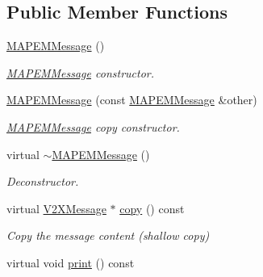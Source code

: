 \subsection*{Public Member Functions}
\begin{DoxyCompactItemize}
\item 
\hyperlink{classMAPEMMessage_af1b0b1d79d1a94869da2709cb2e33f86}{M\+A\+P\+E\+M\+Message} ()\hypertarget{classMAPEMMessage_af1b0b1d79d1a94869da2709cb2e33f86}{}\label{classMAPEMMessage_af1b0b1d79d1a94869da2709cb2e33f86}

\begin{DoxyCompactList}\small\item\em \hyperlink{classMAPEMMessage}{M\+A\+P\+E\+M\+Message} constructor. \end{DoxyCompactList}\item 
\hyperlink{classMAPEMMessage_a618033769eb41ed96b2942103efc0e42}{M\+A\+P\+E\+M\+Message} (const \hyperlink{classMAPEMMessage}{M\+A\+P\+E\+M\+Message} \&other)
\begin{DoxyCompactList}\small\item\em \hyperlink{classMAPEMMessage}{M\+A\+P\+E\+M\+Message} copy constructor. \end{DoxyCompactList}\item 
virtual \hyperlink{classMAPEMMessage_ab51ba0e9274fd8509c503801ee018d84}{$\sim$\+M\+A\+P\+E\+M\+Message} ()\hypertarget{classMAPEMMessage_ab51ba0e9274fd8509c503801ee018d84}{}\label{classMAPEMMessage_ab51ba0e9274fd8509c503801ee018d84}

\begin{DoxyCompactList}\small\item\em Deconstructor. \end{DoxyCompactList}\item 
virtual \hyperlink{classV2XMessage}{V2\+X\+Message} $\ast$ \hyperlink{classMAPEMMessage_accc512420a152a574133636c19352d3c}{copy} () const 
\begin{DoxyCompactList}\small\item\em Copy the message content (shallow copy) \end{DoxyCompactList}\item 
virtual void \hyperlink{classMAPEMMessage_aaa09578933eace990edc3f1a3b0af50b}{print} () const \hypertarget{classMAPEMMessage_aaa09578933eace990edc3f1a3b0af50b}{}\label{classMAPEMMessage_aaa09578933eace990edc3f1a3b0af50b}


\end{DoxyCompactItemize}
